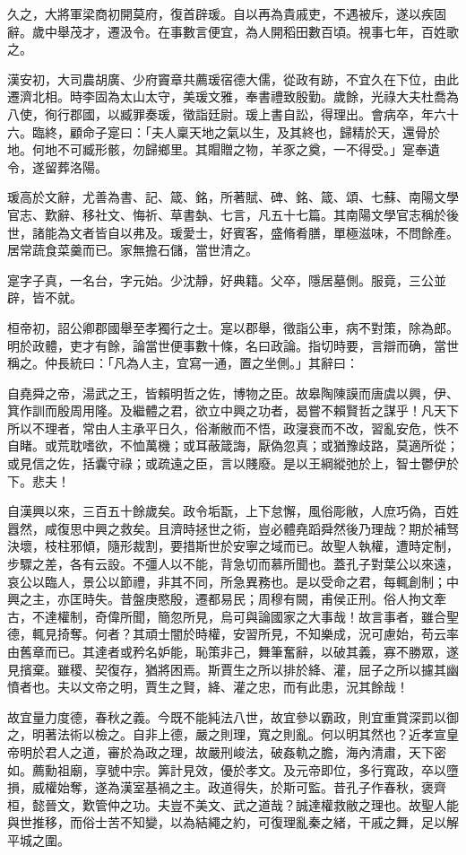 \begin{pinyinscope}
久之，大將軍梁商初開莫府，復首辟瑗。自以再為貴戚吏，不遇被斥，遂以疾固辭。歲中舉茂才，遷汲令。在事數言便宜，為人開稻田數百頃。視事七年，百姓歌之。

漢安初，大司農胡廣、少府竇章共薦瑗宿德大儒，從政有跡，不宜久在下位，由此遷濟北相。時李固為太山太守，美瑗文雅，奉書禮致殷勤。歲餘，光祿大夫杜喬為八使，徇行郡國，以臧罪奏瑗，徵詣廷尉。瑗上書自訟，得理出。會病卒，年六十六。臨終，顧命子寔曰：「夫人稟天地之氣以生，及其終也，歸精於天，還骨於地。何地不可臧形骸，勿歸鄉里。其賵贈之物，羊豕之奠，一不得受。」寔奉遺令，遂留葬洛陽。

瑗高於文辭，尤善為書、記、箴、銘，所著賦、碑、銘、箴、頌、七蘇、南陽文學官志、歎辭、移社文、悔祈、草書埶、七言，凡五十七篇。其南陽文學官志稱於後世，諸能為文者皆自以弗及。瑗愛士，好賓客，盛脩肴膳，單極滋味，不問餘產。居常蔬食菜羹而已。家無擔石儲，當世清之。

寔字子真，一名台，字元始。少沈靜，好典籍。父卒，隱居墓側。服竟，三公並辟，皆不就。

桓帝初，詔公卿郡國舉至孝獨行之士。寔以郡舉，徵詣公車，病不對策，除為郎。明於政體，吏才有餘，論當世便事數十條，名曰政論。指切時要，言辯而确，當世稱之。仲長統曰：「凡為人主，宜寫一通，置之坐側。」其辭曰：

自堯舜之帝，湯武之王，皆賴明哲之佐，博物之臣。故皋陶陳謨而唐虞以興，伊、箕作訓而殷周用隆。及繼體之君，欲立中興之功者，曷嘗不賴賢哲之謀乎！凡天下所以不理者，常由人主承平日久，俗漸敝而不悟，政寖衰而不改，習亂安危，怢不自睹。或荒耽嗜欲，不恤萬機；或耳蔽箴誨，厭偽忽真；或猶豫歧路，莫適所從；或見信之佐，括囊守祿；或疏遠之臣，言以賤廢。是以王綱縱弛於上，智士鬱伊於下。悲夫！

自漢興以來，三百五十餘歲矣。政令垢翫，上下怠懈，風俗彫敝，人庶巧偽，百姓囂然，咸復思中興之救矣。且濟時拯世之術，豈必體堯蹈舜然後乃理哉？期於補驽決壞，枝柱邪傾，隨形裁割，要措斯世於安寧之域而已。故聖人執權，遭時定制，步驟之差，各有云設。不彊人以不能，背急切而慕所聞也。蓋孔子對葉公以來遠，哀公以臨人，景公以節禮，非其不同，所急異務也。是以受命之君，每輒創制；中興之主，亦匡時失。昔盤庚愍殷，遷都易民；周穆有闕，甫侯正刑。俗人拘文牽古，不達權制，奇偉所聞，簡忽所見，烏可與論國家之大事哉！故言事者，雖合聖德，輒見掎奪。何者？其頑士闇於時權，安習所見，不知樂成，況可慮始，苟云率由舊章而已。其達者或矜名妒能，恥策非己，舞筆奮辭，以破其義，寡不勝眾，遂見擯棄。雖稷、契復存，猶將困焉。斯賈生之所以排於絳、灌，屈子之所以攄其幽憤者也。夫以文帝之明，賈生之賢，絳、灌之忠，而有此患，況其餘哉！

故宜量力度德，春秋之義。今既不能純法八世，故宜參以霸政，則宜重賞深罰以御之，明著法術以檢之。自非上德，嚴之則理，寬之則亂。何以明其然也？近孝宣皇帝明於君人之道，審於為政之理，故嚴刑峻法，破姦軌之膽，海內清肅，天下密如。薦勳祖廟，享號中宗。筭計見效，優於孝文。及元帝即位，多行寬政，卒以墮損，威權始奪，遂為漢室基禍之主。政道得失，於斯可監。昔孔子作春秋，褒齊桓，懿晉文，歎管仲之功。夫豈不美文、武之道哉？誠達權救敝之理也。故聖人能與世推移，而俗士苦不知變，以為結繩之約，可復理亂秦之緒，干戚之舞，足以解平城之圍。


\end{pinyinscope}
